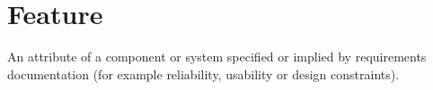 \section{Feature}
\label{sec:Feature}

An attribute of a component or system specified or implied by requirements documentation (for example reliability, usability or design constraints).
